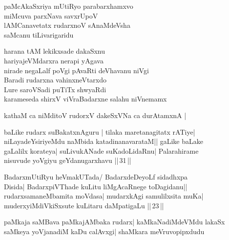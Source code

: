 \begin{entry}
\gl{}
\begin{shl}
paMcAkaSxriya mUtiRyo parabarxhamxvo\\
miMcuva parxNava savxrUpoV\\
lAMCanavetatx rudarxnoV sAnaMdeVsha\\
saMcanu tiLivarigaridu
\end{shl}
\gl{}
\begin{shl}
harana tAM lekikxsade dakaSxnu\\
hariyajeVMdarxra nerapi yAgava\\
nirade negaLalf poVgi pAvaRti deVhavanu niVgi\\
Baradi rudarxna vahinxneVtarxdo\\
Lure saroVSadi puTiTx shwyaRdi\\
karameseda shirxV viVraBadarxne salahu niVnemamx
\end{shl}
\gl{}
\begin{shl}
kathaM ca niMditoV rudorxV dakeSxVNa ca durAtamxnA |
\end{shl}
\begin{shl}
baLike rudarx suBakatxnAguru | tilaka maretanagitatx rATiye|\\
niLayadeYsiriyeMdu naMbida katadinanavarataM|| gaLike baLake\\
gaLalilx korateya| suLivukANade suKadoLidaRnu| Palarahirame\\
nisuvude yoVgiyu geYdanugarxhavu ||\,31\,||
\end{shl}
\begin{shl}
BadarxmUtiRyu heVmakUTada/ BadarxdeDeyoLf sidadhxpa\\
Disida| BadarxpiVThade kuLitu liMgAcaRnege toDagidanu||\\
rudarxsamaneMbamita moVdasa| mudarxkAgi samulilxsita muKa|\\
muderxyiMdiVkiSxsute kuLitaru daMpatigaLu ||\,23\,||
\end{shl}
\gl{}
\begin{shl}
paMkaja saMBava paMkajAMbaka rudarx| kaMkaNadiMdeVMdu lakaSx\\
saMkeya yoVjanadiM kaDu calAvxgi| shaMkara meVruvopipxdudu
\end{shl}
\end{entry}
